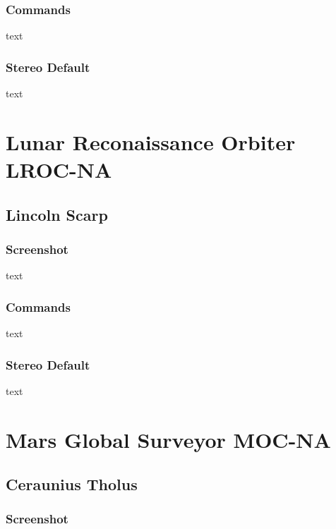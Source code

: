 \subsubsection*{Commands}

text

\subsubsection*{Stereo Default}

text

\section{Lunar Reconaissance Orbiter LROC-NA}

\subsection{Lincoln Scarp}

\subsubsection*{Screenshot}

text

\subsubsection*{Commands}

text

\subsubsection*{Stereo Default}

text

\section{Mars Global Surveyor MOC-NA}

\subsection{Ceraunius Tholus}

\subsubsection*{Screenshot}

